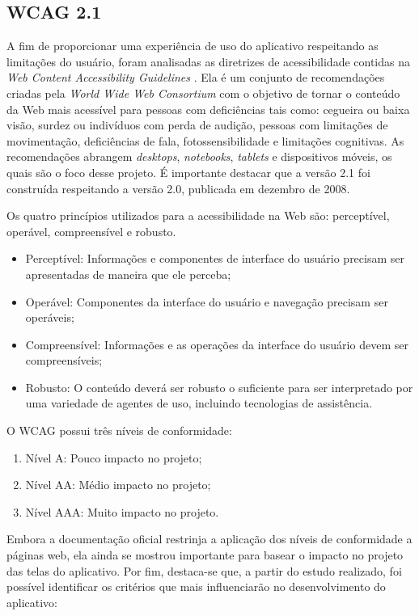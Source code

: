 \subsection{WCAG 2.1}
A fim de proporcionar uma experiência de uso do aplicativo respeitando as limitações do usuário, foram analisadas as diretrizes de acessibilidade contidas na \textit{Web Content Accessibility Guidelines} \citep{wcag}. Ela é um conjunto de recomendações criadas pela
\textit{World Wide Web Consortium} \citep{w3c} com o objetivo de tornar o conteúdo da Web mais acessível para pessoas com deficiências tais como: cegueira ou baixa visão, surdez ou indivíduos com perda de audição, pessoas com limitações de movimentação, deficiências de fala, fotossensibilidade e limitações cognitivas. As recomendações abrangem \textit{desktops}, \textit{notebooks}, \textit{tablets} e dispositivos móveis, os quais são o foco desse projeto. É importante destacar que a versão 2.1 foi construída respeitando a versão 2.0, publicada em dezembro de 2008.

Os quatro princípios utilizados para a acessibilidade na Web são: perceptível, operável, compreensível e robusto.
\begin{itemize}
    \item Perceptível: Informações e componentes de interface do usuário precisam ser apresentadas de maneira que ele perceba;
    \item Operável: Componentes da interface do usuário e navegação precisam ser operáveis;
    \item Compreensível: Informações e as operações da interface do usuário devem ser compreensíveis;
    \item Robusto: O conteúdo deverá ser robusto o suficiente para ser interpretado por uma variedade de agentes de uso, incluindo tecnologias de assistência.
\end{itemize}

O WCAG possui três níveis de conformidade:
\begin{enumerate}
    \item Nível A: Pouco impacto no projeto;
    \item Nível AA: Médio impacto no projeto;
    \item Nível AAA: Muito impacto no projeto.
\end{enumerate}

Embora a documentação oficial restrinja a aplicação dos níveis de conformidade a páginas web, ela ainda se mostrou importante para basear o impacto no projeto das telas do aplicativo. 
 Por fim, destaca-se que, a partir do estudo realizado, foi possível identificar os critérios que mais influenciarão no desenvolvimento do aplicativo:

